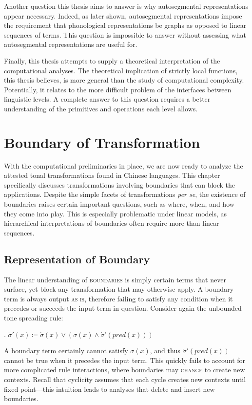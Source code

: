 \documentclass[12pt, a4paper]{report}
\newcommand{\textemph}[1]{\textsc{#1}}
\newcommand{\textfor}[1]{\textit{#1}}
\newcommand{\textterm}[1]{\textsc{#1}\index{#1}}
\begin{document}
Another question this thesis aims to answer is why autosegmental
representations appear necessary.  Indeed, as later shown,
autosegmental representations impose the requirement that phonological
representations be graphs as opposed to linear sequences of terms.
This question is impossible to answer without assessing what
autosegmental representations are useful for.

Finally, this thesis attempts to supply a theoretical interpretation
of the computational analyses.  The theoretical implication of
strictly local functions, this thesis believes, is more general than
the study of computational complexity.  Potentially, it relates to the
more difficult problem of the interfaces between linguistic levels.  A
complete answer to this question requires a better understanding of
the primitives and operations each level allows.

\chapter{Boundary of Transformation}
With the computational preliminaries in place, we are now ready to
analyze the attested tonal transformations found in Chinese languages.
This chapter specifically discusses transformations involving
boundaries that can block the applications.  Despite the simple facets
of transformations \textfor{per se}, the existence of boundaries
raises certain important questions, such as where, when, and how they
come into play.  This is especially problematic under linear models,
as hierarchical interpretations of boundaries often require more than
linear sequences.

\section{Representation of Boundary}
The linear understanding of \textterm{boundaries} is simply certain
terms that never surface, yet block any transformation that may
otherwise apply.  A boundary term is always output \textemph{as is},
therefore failing to satisfy any condition when it precedes or
succeeds the input term in question.  Consider again the unbounded
tone spreading rule:

\ex. \(\acute{\sigma}'(x) \coloneq \acute{\sigma}(x) \lor
(\sigma(x) \land \acute{\sigma}'(\mathit{pred}(x)))\)

A boundary term certainly cannot satisfy \(\sigma(x)\), and thus
\(\acute{\sigma}'(\mathit{pred}(x))\) cannot be true when it precedes
the input term.  This quickly fails to account for more complicated
rule interactions, where boundaries may \textemph{change} to create
new contexts.  Recall that cyclicity assumes that each cycle creates
new contexts until fixed point---this intuition leads to analyses that
delete and insert new boundaries.
\end{document}
